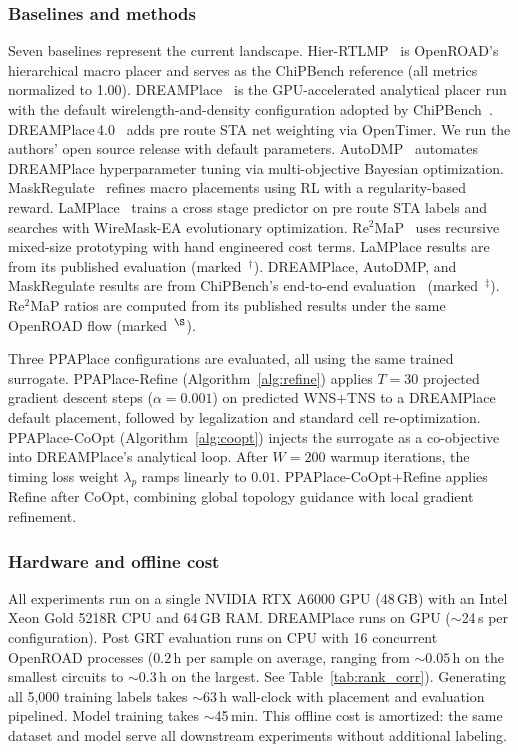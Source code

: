 \documentclass[sigconf,anonymous,review,9pt]{acmart}
\begin{document}
\subsubsection{Baselines and methods}
Seven baselines represent the current landscape.
Hier-RTLMP~\cite{hierrtlmp2023} is OpenROAD's hierarchical macro
placer and serves as the ChiPBench reference (all metrics normalized
to 1.00). DREAMPlace~\cite{lin2019dreamplace} is the GPU-accelerated
analytical placer run with the default wirelength-and-density
configuration adopted by ChiPBench~\cite{chipbench2025}.
DREAMPlace\,4.0~\cite{dreamplace4} adds pre route STA net weighting
via OpenTimer. We run the authors' open source release with default parameters.
AutoDMP~\cite{autodmp2023} automates DREAMPlace hyperparameter tuning
via multi-objective Bayesian optimization.
MaskRegulate~\cite{maskregulate2024} refines macro placements using RL
with a regularity-based reward.
LaMPlace~\cite{lamplace2025} trains a cross stage predictor on
pre route STA labels and searches with WireMask-EA evolutionary
optimization.
Re$^2$MaP~\cite{re2map2025} uses recursive mixed-size prototyping
with hand engineered cost terms.
LaMPlace results are from its published evaluation
(marked~$^\dagger$). DREAMPlace, AutoDMP, and MaskRegulate results
are from ChiPBench's end-to-end evaluation~\cite{chipbench2025}
(marked~$^\ddagger$). Re$^2$MaP ratios are computed from its
published results under the same OpenROAD flow (marked~$^\S$).

Three PPAPlace configurations are evaluated, all using the same
trained surrogate. PPAPlace-Refine (Algorithm~\ref{alg:refine})
applies $T{=}30$ projected gradient descent steps
($\alpha{=}0.001$) on predicted WNS$+$TNS to a DREAMPlace default
placement, followed by legalization and standard cell re-optimization.
PPAPlace-CoOpt (Algorithm~\ref{alg:coopt}) injects the surrogate as a
co-objective into DREAMPlace's analytical loop. After $W{=}200$ warmup
iterations, the timing loss weight $\lambda_p$ ramps linearly to $0.01$.
PPAPlace-CoOpt{+}Refine applies Refine after CoOpt, combining global
topology guidance with local gradient refinement.

\subsubsection{Hardware and offline cost}
All experiments run on a single NVIDIA RTX A6000 GPU (48\,GB) with an
Intel Xeon Gold 5218R CPU and 64\,GB RAM. DREAMPlace runs on GPU
(${\sim}$24\,s per configuration). Post GRT evaluation runs on CPU
with 16 concurrent OpenROAD processes
($0.2$\,h per sample on average, ranging from ${\sim}0.05$\,h on the
smallest circuits to ${\sim}0.3$\,h on the largest. See
Table~\ref{tab:rank_corr}). Generating all 5{,}000 training labels
takes ${\sim}$63\,h wall-clock with placement and evaluation
pipelined. Model training takes ${\sim}$45\,min. This offline cost is
amortized: the same dataset and model serve all downstream experiments
without additional labeling.
\end{document}

